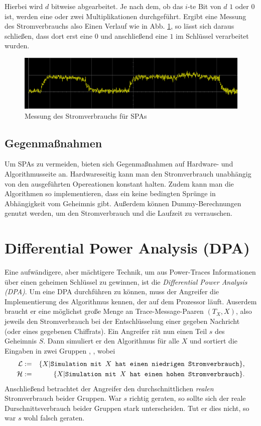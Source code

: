 Hierbei wird $d$ bitweise abgearbeitet. Je nach dem, ob das $i$-te Bit
von $d$ $1$ oder $0$ ist, werden eine oder zwei Multiplikationen
durchgeführt. Ergibt eine Messung des Stromverbrauchs also Einen Verlauf
wie in Abb. \ref{abb:power-attack}, so lässt sich daraus schließen, dass
dort erst eine $0$ und anschließend eine $1$ im Schlüssel verarbeitet wurden.

\begin{figure}[h]
  \centering
  \includegraphics[width=\textwidth]{images/Power_attack}
  \caption{Messung des Stromverbrauchs für SPAs}
  \label{abb:power-attack}
\end{figure}

\subsection{Gegenmaßnahmen}
Um SPAs zu vermeiden, bieten sich Gegenmaßnahmen auf Hardware- und
Algorithmusseite an. Hardwareseitig kann man den Stromverbrauch
unabhängig von den ausgeführten Opereationen konstant halten. Zudem kann
man die Algorithmen so implementieren, dass ein keine bedingten Sprünge
in Abhängigkeit vom Geheimnis gibt. Außerdem können Dummy-Berechnungen
genutzt werden, um den Stromverbrauch und die Laufzeit  zu verrauschen.

\section{Differential Power Analysis (DPA)}
Eine aufwändigere, aber mächtigere Technik, um aus Power-Traces
Informationen über einen geheimen Schlüssel zu gewinnen, ist die
\emph{Differential Power Analysis (DPA)}. Um eine DPA durchführen zu
können, muss der Angreifer die Implementierung des Algorithmus kennen,
der auf dem Prozessor läuft. Auserdem braucht er eine möglichst große
Menge an Trace-Message-Paaren $(T_X, X)$, also jeweils den Stromverbrauch bei der
Entschlüsselung einer gegeben Nachricht (oder eines gegebenen
Chiffrats).
Ein Angreifer rät nun einen Teil $s$ des Geheimnis $S$. Dann simuliert
er den Algorithmus für alle $X$ und sortiert die Eingaben in zwei
Gruppen \calL, \calH, wobei
\begin{eqnarray*}
\mathcal{L} & := &\{X| \texttt{Simulation mit $X$ hat einen niedrigen
  Stromverbrauch}\},\\
\mathcal{H} & := &\{X| \texttt{Simulation mit $X$ hat einen hohen
  Stromverbrauch}\}.
\end{eqnarray*}
Anschließend betrachtet der Angreifer den durchschnittlichen
\textit{realen} Stromverbrauch beider Gruppen. War $s$ richtig geraten,
so sollte sich der reale Durschnittsverbrauch beider Gruppen stark
unterscheiden. Tut er dies nicht, so war $s$ wohl falsch geraten.

